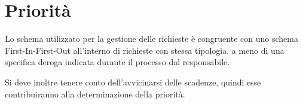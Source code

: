 %
%
\section[Priorità]{Priorità}
\label{rf-priority}
Lo schema utilizzato per la gestione delle richieste è congruente con uno schema \ac{First-In-First-Out} all'interno di richieste con stessa tipologia, a meno di una specifica deroga indicata durante il processo dal responsabile.

Si deve inoltre tenere conto dell'avvicinarsi delle scadenze, quindi esse contribuiranno alla determinazione della priorità.